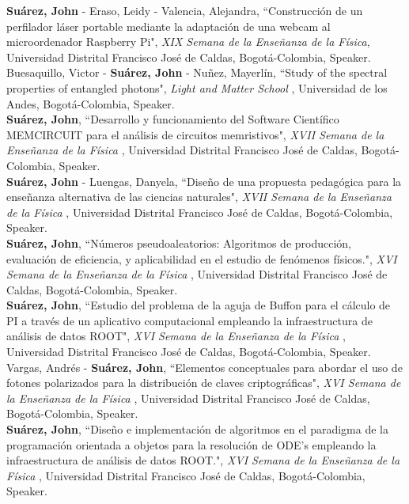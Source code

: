 \documentclass[10pt, a4paper]{article}
\newcommand{\years}[1]{\marginnote{\scriptsize #1}}
\begin{document}
\years{2016}\textbf{Suárez, John} - Eraso, Leidy - Valencia, Alejandra, “Construcción de un perfilador láser portable mediante la adaptación de una webcam al microordenador Raspberry Pi", \emph{XIX Semana de la Enseñanza de la Física}, Universidad Distrital Francisco José de Caldas, Bogotá-Colombia, Speaker.\\

\years{2016}Buesaquillo, Victor - \textbf{Suárez, John} - Nuñez, Mayerlín, “Study of the spectral properties of entangled photons", \emph{Light and Matter School }, Universidad de los Andes, Bogotá-Colombia, Speaker.\\

\years{2014}\textbf{Suárez, John}, “Desarrollo y funcionamiento del Software Científico MEMCIRCUIT para el análisis de circuitos memristivos", \emph{XVII Semana de la Enseñanza de la Física }, Universidad Distrital Francisco José de Caldas, Bogotá-Colombia, Speaker.\\

\years{2014}\textbf{Suárez, John} - Luengas, Danyela, “Diseño de una propuesta pedagógica para la enseñanza alternativa de las ciencias naturales", \emph{XVII Semana de la Enseñanza de la Física }, Universidad Distrital Francisco José de Caldas, Bogotá-Colombia, Speaker.\\

\years{2013}\textbf{Suárez, John}, “Números pseudoaleatorios: Algoritmos de producción, evaluación de eficiencia, y aplicabilidad en el estudio de fenómenos físicos.", \emph{XVI Semana de la Enseñanza de la Física }, Universidad Distrital Francisco José de Caldas, Bogotá-Colombia, Speaker.\\

\years{2013}\textbf{Suárez, John}, “Estudio del problema de la aguja de Buffon para el cálculo de PI a través de un aplicativo computacional empleando la infraestructura de análisis de datos ROOT", \emph{XVI Semana de la Enseñanza de la Física }, Universidad Distrital Francisco José de Caldas, Bogotá-Colombia, Speaker.\\

\years{2013}Vargas, Andrés - \textbf{Suárez, John}, “Elementos conceptuales para abordar el uso de fotones polarizados para la distribución de claves criptográficas", \emph{XVI Semana de la Enseñanza de la Física }, Universidad Distrital Francisco José de Caldas, Bogotá-Colombia, Speaker.\\

\years{2013}\textbf{Suárez, John}, “Diseño e implementación de algoritmos en el paradigma de la programación orientada a objetos para la resolución de ODE's empleando la infraestructura de análisis de datos ROOT.", \emph{XVI Semana de la Enseñanza de la Física }, Universidad Distrital Francisco José de Caldas, Bogotá-Colombia, Speaker.\\
\end{document}
